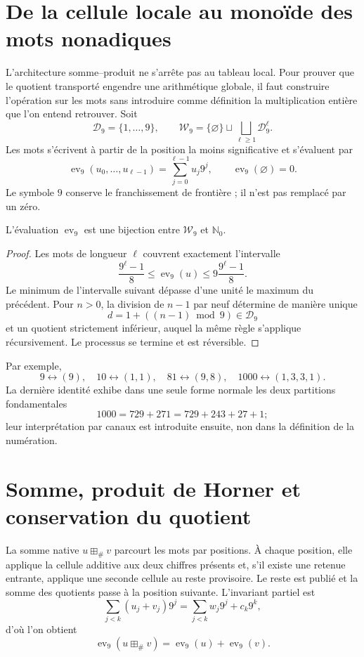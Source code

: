 \ifdefined\HMTTPKWordArithmetic
\section{De la cellule locale au monoïde des mots nonadiques}

L'architecture somme--produit ne s'arrête pas au tableau local. Pour prouver que
le quotient transporté engendre une arithmétique globale, il faut construire
l'opération sur les mots sans introduire comme définition la multiplication
entière que l'on entend retrouver. Soit
\[
 \mathcal D_9=\{1,\ldots,9\},\qquad
 \mathcal W_9=\{\varnothing\}\sqcup
 \bigsqcup_{\ell\geq1}\mathcal D_9^\ell .
\]
Les mots s'écrivent à partir de la position la moins significative et s'évaluent
par
\[
 \operatorname{ev}_9(u_0,\ldots,u_{\ell-1})
 =\sum_{j=0}^{\ell-1}u_j9^j,\qquad
 \operatorname{ev}_9(\varnothing)=0.
\]
Le symbole \(9\) conserve le franchissement de frontière ; il n'est pas remplacé par un zéro.

\begin{theorem}
L'évaluation \(\operatorname{ev}_9\) est une bijection entre
\(\mathcal W_9\) et \(\mathbb N_0\).
\end{theorem}
\begin{proof}
Les mots de longueur \(\ell\) couvrent exactement l'intervalle
\[
 \frac{9^\ell-1}{8}
 \leq\operatorname{ev}_9(u)
 \leq9\frac{9^\ell-1}{8}.
\]
Le minimum de l'intervalle suivant dépasse d'une unité le maximum du
précédent. Pour \(n>0\), la division de \(n-1\) par neuf détermine de manière
unique
\[
 d=1+((n-1)\bmod9)\in\mathcal D_9
\]
et un quotient strictement inférieur, auquel la même règle s'applique
récursivement. Le processus se termine et est réversible.
\end{proof}
Par exemple,
\[
 9\leftrightarrow(9),\quad
 10\leftrightarrow(1,1),\quad
 81\leftrightarrow(9,8),\quad
 1000\leftrightarrow(1,3,3,1).
\]
La dernière identité exhibe dans une seule forme normale les deux partitions
fondamentales
\[
 1000=729+271=729+243+27+1;
\]
leur interprétation par canaux est introduite ensuite, non dans la définition
de la numération.

\section{Somme, produit de Horner et conservation du quotient}

La somme native \(u\boxplus_\#v\) parcourt les mots par positions. À chaque
position, elle applique la cellule additive aux deux chiffres présents et, s'il existe
une retenue entrante, applique une seconde cellule au reste provisoire. Le
reste est publié et la somme des quotients passe à la position suivante.
L'invariant partiel est
\[
 \sum_{j<k}(u_j+v_j)9^j
 =\sum_{j<k}w_j9^j+c_k9^k,
\]
d'où l'on obtient
\[
 \operatorname{ev}_9(u\boxplus_\#v)
 =\operatorname{ev}_9(u)+\operatorname{ev}_9(v).
\]

